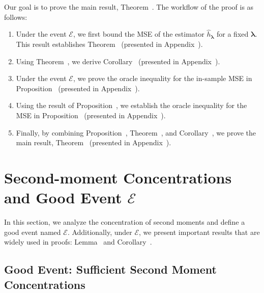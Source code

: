 \documentclass[12pt,a4paper,pdftex,onepage]{article}
\newcommand{\event}{\mathscr{E}}
\begin{document}
Our goal is to prove the main result, Theorem~. The workflow of the proof is as follows:  
\begin{enumerate}  
\item Under the event $\event$, we first bound the MSE of the estimator $\hat{h}_{\bm{\lambda}}$ for a fixed $\bm{\lambda}$.  
This result establishes Theorem~ (presented in Appendix~).  

\item Using Theorem~, we derive Corollary~ (presented in Appendix~).  

\item Under the event $\event$, we prove the oracle inequality for the in-sample MSE in Proposition~ (presented in Appendix~).  

\item Using the result of Proposition~, we establish the oracle inequality for the MSE in Proposition~ (presented in Appendix~).  

\item Finally, by combining Proposition~, Theorem~, and Corollary~, we prove the main result, Theorem~ (presented in Appendix~).  
\end{enumerate}  




\section{Second-moment Concentrations and Good Event $\event$}\label{section; good events and second moments}
In this section, we analyze the concentration of second moments and define a good event named $\event$. Additionally, under $\event$, we present important results that are widely used in proofs: Lemma~ and Corollary~.

\subsection{Good Event: Sufficient Second Moment Concentrations}
\end{document}

